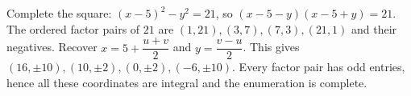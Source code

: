 Complete the square: $(x-5)^2-y^2=21$, so $(x-5-y)(x-5+y)=21$. The ordered factor pairs of $21$ are $(1,21),(3,7),(7,3),(21,1)$ and their negatives. Recover $x=5+\dfrac{u+v}{2}$ and $y=\dfrac{v-u}{2}$. This gives $\boxed{(16,\pm10),(10,\pm2),(0,\pm2),(-6,\pm10)}$. Every factor pair has odd entries, hence all these coordinates are integral and the enumeration is complete.
